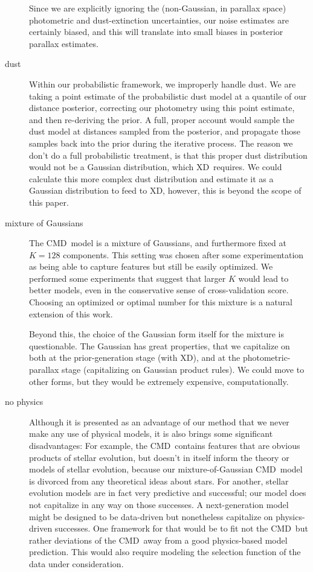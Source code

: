 \documentclass[modern]{aastex61}
\newcommand{\acronym}[1]{{\small{#1}}}
\newcommand{\xd}{\acronym{XD}}
\newcommand{\cmd}{\acronym{CMD}}
\begin{document}
\begin{description}
  Since we are explicitly ignoring the (non-Gaussian, in parallax space) photometric
  and dust-extinction uncertainties, our noise estimates are certainly biased, and
  this will translate into small biases in posterior parallax estimates.
\item[dust] Within our probabilistic framework, we improperly handle
  dust. We are taking a point estimate of the probabilistic dust model
  at a quantile of our distance posterior, correcting our photometry
  using this point estimate, and then re-deriving the prior. A full,
  proper account would sample the dust model at distances sampled from
  the posterior, and propagate those samples back into the prior
  during the iterative process. The reason we don't do a full
  probabilistic treatment, is that this proper dust distribution would
  not be a Gaussian distribution, which \xd\ requires. We could
  calculate this more complex dust distribution and estimate it as a
  Gaussian distribution to feed to \xd, however, this is beyond the
  scope of this paper.
\item[mixture of Gaussians] The \cmd\ model is a mixture of Gaussians,
  and furthermore fixed at $K=128$ components. This setting was chosen
  after some experimentation as being able to capture features but still
  be easily optimized. We performed some experiments
  that suggest that larger $K$ would lead to better models, even in the
  conservative sense of cross-validation score. Choosing an optimized or
  optimal number for this mixture is a natural extension of this work.

  Beyond this, the choice of the Gaussian form itself for the mixture is
  questionable. The Gaussian has great properties, that we capitalize on
  both at the prior-generation stage (with \xd), and at the photometric-parallax
  stage (capitalizing on Gaussian product rules). We could move to other
  forms, but they would be extremely expensive, computationally.
\item[no physics] Although it is presented as an advantage of our
  method that we never make any use of physical models, it is also
  brings some significant disadvantages: For example, the \cmd\ contains
  features that are obvious products of stellar evolution, but doesn't in
  itself inform the theory or models of stellar evolution, because our
  mixture-of-Gaussian \cmd\ model is divorced from any theoretical ideas
  about stars. For another, stellar evolution models are in fact very
  predictive and successful; our model does not capitalize in any way on
  those successes. A next-generation model might be designed to be data-driven
  but nonetheless capitalize on physics-driven successes. One framework
  for that would be to fit not the \cmd\ but rather deviations of the \cmd\ away
  from a good physics-based model prediction. This would also require modeling the selection function of the data under consideration.
\end{description}
\end{document}
